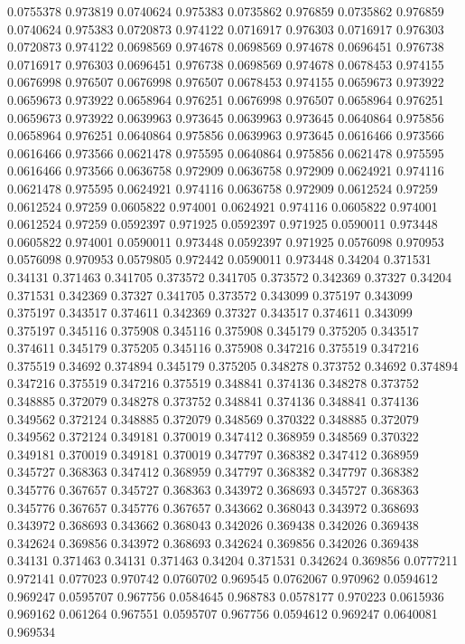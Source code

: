 0.0755378 0.973819
0.0740624 0.975383
0.0735862 0.976859
0.0735862 0.976859
0.0740624 0.975383
0.0720873 0.974122
0.0716917 0.976303
0.0716917 0.976303
0.0720873 0.974122
0.0698569 0.974678
0.0698569 0.974678
0.0696451 0.976738
0.0716917 0.976303
0.0696451 0.976738
0.0698569 0.974678
0.0678453 0.974155
0.0676998 0.976507
0.0676998 0.976507
0.0678453 0.974155
0.0659673 0.973922
0.0659673 0.973922
0.0658964 0.976251
0.0676998 0.976507
0.0658964 0.976251
0.0659673 0.973922
0.0639963 0.973645
0.0639963 0.973645
0.0640864 0.975856
0.0658964 0.976251
0.0640864 0.975856
0.0639963 0.973645
0.0616466 0.973566
0.0616466 0.973566
0.0621478 0.975595
0.0640864 0.975856
0.0621478 0.975595
0.0616466 0.973566
0.0636758 0.972909
0.0636758 0.972909
0.0624921 0.974116
0.0621478 0.975595
0.0624921 0.974116
0.0636758 0.972909
0.0612524 0.97259
0.0612524 0.97259
0.0605822 0.974001
0.0624921 0.974116
0.0605822 0.974001
0.0612524 0.97259
0.0592397 0.971925
0.0592397 0.971925
0.0590011 0.973448
0.0605822 0.974001
0.0590011 0.973448
0.0592397 0.971925
0.0576098 0.970953
0.0576098 0.970953
0.0579805 0.972442
0.0590011 0.973448
0.34204 0.371531
0.34131 0.371463
0.341705 0.373572
0.341705 0.373572
0.342369 0.37327
0.34204 0.371531
0.342369 0.37327
0.341705 0.373572
0.343099 0.375197
0.343099 0.375197
0.343517 0.374611
0.342369 0.37327
0.343517 0.374611
0.343099 0.375197
0.345116 0.375908
0.345116 0.375908
0.345179 0.375205
0.343517 0.374611
0.345179 0.375205
0.345116 0.375908
0.347216 0.375519
0.347216 0.375519
0.34692 0.374894
0.345179 0.375205
0.348278 0.373752
0.34692 0.374894
0.347216 0.375519
0.347216 0.375519
0.348841 0.374136
0.348278 0.373752
0.348885 0.372079
0.348278 0.373752
0.348841 0.374136
0.348841 0.374136
0.349562 0.372124
0.348885 0.372079
0.348569 0.370322
0.348885 0.372079
0.349562 0.372124
0.349181 0.370019
0.347412 0.368959
0.348569 0.370322
0.349181 0.370019
0.349181 0.370019
0.347797 0.368382
0.347412 0.368959
0.345727 0.368363
0.347412 0.368959
0.347797 0.368382
0.347797 0.368382
0.345776 0.367657
0.345727 0.368363
0.343972 0.368693
0.345727 0.368363
0.345776 0.367657
0.345776 0.367657
0.343662 0.368043
0.343972 0.368693
0.343972 0.368693
0.343662 0.368043
0.342026 0.369438
0.342026 0.369438
0.342624 0.369856
0.343972 0.368693
0.342624 0.369856
0.342026 0.369438
0.34131 0.371463
0.34131 0.371463
0.34204 0.371531
0.342624 0.369856
0.0777211 0.972141
0.077023 0.970742
0.0760702 0.969545
0.0762067 0.970962
0.0594612 0.969247
0.0595707 0.967756
0.0584645 0.968783
0.0578177 0.970223
0.0615936 0.969162
0.061264 0.967551
0.0595707 0.967756
0.0594612 0.969247
0.0640081 0.969534
